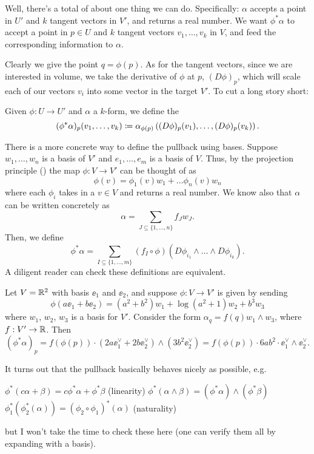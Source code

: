 Well, there's a total of about one thing we can do.
Specifically: $\alpha$ accepts a point in $U'$ and $k$ tangent vectors in $V'$,
and returns a real number.
We want $\phi^\ast \alpha$ to accept a point in $p \in U$
and $k$ tangent vectors $v_1, \dots, v_k$ in $V$,
and feed the corresponding information to $\alpha$.

Clearly we give the point $q = \phi(p)$.
As for the tangent vectors, since we are interested in volume, we take the
derivative of $\phi$ at $p$, $(D\phi)_p$, which will scale each of our vectors $v_i$
into some vector in the target $V'$.
To cut a long story short:
\begin{definition}
	Given $\phi : U \to U'$ and $\alpha$ a $k$-form, we define the 
	\[
		(\phi^\ast \alpha)_p(v_1, \dots, v_k)
		\coloneqq \alpha_{\phi(p)}
		\left( (D\phi)_p(v_1), \dots, (D\phi)_p(v_k) \right).
	\]
\end{definition}

There is a more concrete way to define the pullback using bases.
Suppose $w_1, \dots, w_n$ is a basis of $V'$
and $e_1, \dots, e_m$ is a basis of $V$.
Thus, by the projection principle () 
the map $\phi : V \to V'$ can be thought of as
\[ \phi(v) = \phi_1(v) w_1 +  \dots \phi_n(v) w_n \]
where each $\phi_i$ takes in a $v \in V$ and returns a real number.
We know also that $\alpha$ can be written concretely as
\[ \alpha = \sum_{J \subseteq \{1, \dots, n\}} f_J w_J. \]
Then, we define
\[
	\phi^\ast\alpha
	= \sum_{I \subseteq \{1, \dots, m\}}
	(f_I \circ \phi) (D\phi_{i_1} \wedge \dots \wedge D\phi_{i_k}).
\]
A diligent reader can check these definitions are equivalent.
\begin{example}
	Let $V = \mathbb R^2$ with basis $\ee_1$ and $\ee_2$,
	and suppose $\phi : V \to V'$ is given by sending
	\[ \phi(a\ee_1 + b\ee_2) = (a^2+b^2)w_1 + \log(a^2+1) w_2 + b^3 w_3 \]
	where $w_1$, $w_2$, $w_3$ is a basis for $V'$.
	Consider the form $\alpha_q = f(q) w_1 \wedge w_3$, where $f : V' \to \mathbb R$.
	Then
	\[ (\phi^\ast\alpha)_p = f(\phi(p)) \cdot (2a \ee_1^\vee + 2b\ee_2^\vee) \wedge (3b^2 \ee_2^\vee)
		= f(\phi(p)) \cdot 6ab^2 \cdot \ee_1^\vee \wedge \ee_2^\vee. \]
\end{example}

It turns out that the pullback basically behaves nicely as possible, e.g.\
\begin{itemize}
	\ii $\phi^\ast(c\alpha + \beta) = c\phi^\ast \alpha + \phi^\ast\beta$ (linearity)
	\ii $\phi^\ast(\alpha\wedge\beta)
	= (\phi^\ast \alpha)\wedge(\phi^\ast \beta)$
	\ii $\phi_1^\ast(\phi_2^\ast(\alpha)) 
	= (\phi_2 \circ \phi_1)^\ast(\alpha)$ (naturality)
\end{itemize}
but I won't take the time to check these here
(one can verify them all by expanding with a basis).
	
